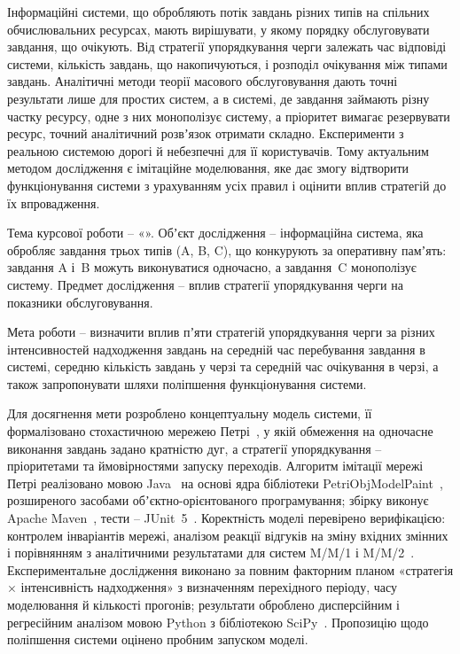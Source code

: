 
Інформаційні системи, що обробляють потік завдань різних типів на спільних обчислювальних
ресурсах, мають вирішувати, у якому порядку обслуговувати завдання, що очікують. Від стратегії
упорядкування черги залежать час відповіді системи, кількість завдань, що накопичуються, і
розподіл очікування між типами завдань. Аналітичні методи теорії масового обслуговування дають
точні результати лише для простих систем, а в системі, де завдання займають різну частку
ресурсу, одне з них монополізує систему, а пріоритет вимагає резервувати ресурс, точний
аналітичний розвʼязок отримати складно. Експерименти з реальною системою дорогі й небезпечні
для її користувачів. Тому актуальним методом дослідження є імітаційне моделювання, яке дає
змогу відтворити функціонування системи з урахуванням усіх правил і оцінити вплив стратегій
до їх впровадження.

Тема курсової роботи -- «\kpiTitle». Обʼєкт дослідження -- інформаційна система, яка обробляє
завдання трьох типів (A, B, C), що конкурують за оперативну памʼять: завдання A і~B можуть
виконуватися одночасно, а завдання~C монополізує систему. Предмет дослідження -- вплив стратегії
упорядкування черги на показники обслуговування.

Мета роботи -- визначити вплив пʼяти стратегій упорядкування черги за різних інтенсивностей
надходження завдань на середній час перебування завдання в системі, середню кількість завдань у
черзі та середній час очікування в черзі, а також запропонувати шляхи поліпшення
функціонування системи.

Для досягнення мети розроблено концептуальну модель системи, її формалізовано стохастичною
мережею Петрі~\cite{stetsenko-kursova, stetsenko-modeling}, у якій обмеження на одночасне
виконання завдань задано кратністю дуг, а стратегії упорядкування -- пріоритетами та
ймовірностями запуску переходів. Алгоритм імітації мережі Петрі реалізовано мовою
Java~\cite{java-jls} на основі ядра бібліотеки PetriObjModelPaint~\cite{petriobjmodelpaint},
розширеного засобами обʼєктно-орієнтованого програмування; збірку виконує Apache
Maven~\cite{maven}, тести -- JUnit~5~\cite{junit}. Коректність моделі перевірено верифікацією:
контролем інваріантів мережі, аналізом реакції відгуків на зміну вхідних змінних і порівнянням з
аналітичними результатами для систем M/M/1 і M/M/2~\cite{kleinrock}. Експериментальне дослідження виконано за повним факторним планом
«стратегія $\times$ інтенсивність надходження» з визначенням перехідного періоду, часу
моделювання й кількості прогонів; результати оброблено дисперсійним і регресійним
аналізом мовою Python з бібліотекою SciPy~\cite{scipy}. Пропозицію щодо поліпшення системи оцінено пробним запуском
моделі.
